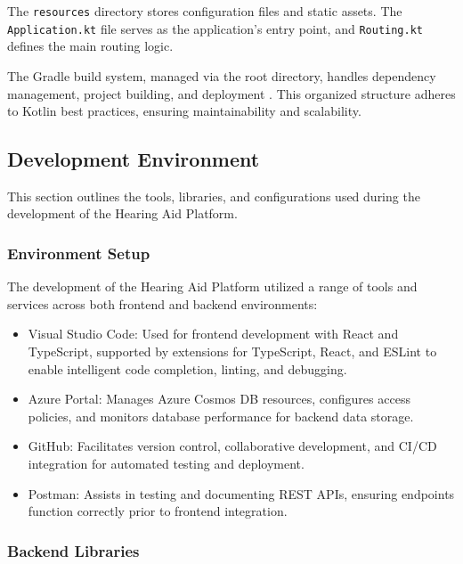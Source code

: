 \documentclass{article}
\begin{document}
The \texttt{resources} directory stores configuration files and static assets. The \texttt{Application.kt} file serves as the application's entry point, and \texttt{Routing.kt} defines the main routing logic.

The Gradle build system, managed via the root directory, handles dependency management, project building, and deployment \cite{gradle_guide_2024}. This organized structure adheres to Kotlin best practices, ensuring maintainability and scalability.


\subsection{Development Environment}

This section outlines the tools, libraries, and configurations used during the development of the Hearing Aid Platform.

\subsubsection{Environment Setup}

The development of the Hearing Aid Platform utilized a range of tools and services across both frontend and backend environments:

\begin{itemize}
    
    \item Visual Studio Code: Used for frontend development with React and TypeScript, supported by extensions for TypeScript, React, and ESLint to enable intelligent code completion, linting, and debugging. 
    
    \item Azure Portal: Manages Azure Cosmos DB resources, configures access policies, and monitors database performance for backend data storage.
    
    \item GitHub: Facilitates version control, collaborative development, and CI/CD integration for automated testing and deployment.
    
    \item Postman: Assists in testing and documenting REST APIs, ensuring endpoints function correctly prior to frontend integration.
\end{itemize}

\subsubsection{Backend Libraries}
\end{document}
